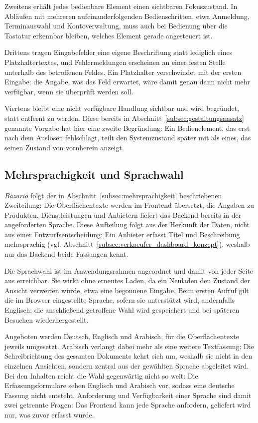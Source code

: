 Zweitens erhält jedes bedienbare Element einen sichtbaren
Fokuszustand. In Abläufen mit mehreren aufeinanderfolgenden
Bedienschritten, etwa Anmeldung, Terminauswahl und Kontoverwaltung,
muss auch bei Bedienung über die Tastatur erkennbar bleiben, welches
Element gerade angesteuert ist.

Drittens tragen Eingabefelder eine eigene Beschriftung statt
lediglich eines Platzhaltertextes, und Fehlermeldungen erscheinen an
einer festen Stelle unterhalb des betroffenen Feldes. Ein Platzhalter
verschwindet mit der ersten Eingabe; die Angabe, was das Feld
erwartet, wäre damit genau dann nicht mehr verfügbar, wenn sie
überprüft werden soll.

Viertens bleibt eine nicht verfügbare Handlung sichtbar und wird
begründet, statt entfernt zu werden. Diese bereits in
Abschnitt~\ref{subsec:gestaltungsansatz} genannte Vorgabe hat hier
eine zweite Begründung: Ein Bedienelement, das erst nach dem Auslösen
fehlschlägt, teilt den Systemzustand später mit als eines, das seinen
Zustand von vornherein anzeigt.


\subsection{Mehrsprachigkeit und Sprachwahl}
\label{subsec:mehrsprachigkeit_konzept}

\textit{Bazario} folgt der in
Abschnitt~\ref{subsec:mehrsprachigkeit} beschriebenen Zweiteilung:
Die Oberflächentexte werden im Frontend übersetzt, die Angaben zu
Produkten, Dienstleistungen und Anbietern liefert das Backend bereits
in der angeforderten Sprache. Diese Aufteilung folgt aus der Herkunft
der Daten, nicht aus einer Entwurfsentscheidung: Ein Anbieter erfasst
Titel und Beschreibung mehrsprachig (vgl.
Abschnitt~\ref{subsec:verkaeufer_dashboard_konzept}), weshalb nur das
Backend beide Fassungen kennt.

Die Sprachwahl ist im Anwendungsrahmen angeordnet und damit von jeder
Seite aus erreichbar. Sie wirkt ohne erneutes Laden, da ein Neuladen
den Zustand der Ansicht verwerfen würde, etwa eine begonnene Eingabe.
Beim ersten Aufruf gilt die im Browser eingestellte Sprache, sofern
sie unterstützt wird, andernfalls Englisch; die anschließend
getroffene Wahl wird gespeichert und bei späteren Besuchen
wiederhergestellt.

Angeboten werden Deutsch, Englisch und Arabisch, für die
Oberflächentexte jeweils umgesetzt. Arabisch verlangt
dabei mehr als eine weitere Textfassung: Die Schreibrichtung des
gesamten Dokuments kehrt sich um, weshalb sie nicht in den einzelnen
Ansichten, sondern zentral aus der gewählten Sprache abgeleitet wird. Bei den Inhalten reicht die Wahl gegenwärtig
nicht so weit: Die Erfassungsformulare sehen Englisch und Arabisch
vor, sodass eine deutsche Fassung nicht entsteht. Anforderung und
Verfügbarkeit einer Sprache sind damit zwei getrennte Fragen: Das
Frontend kann jede Sprache anfordern, geliefert wird nur, was zuvor
erfasst wurde.


